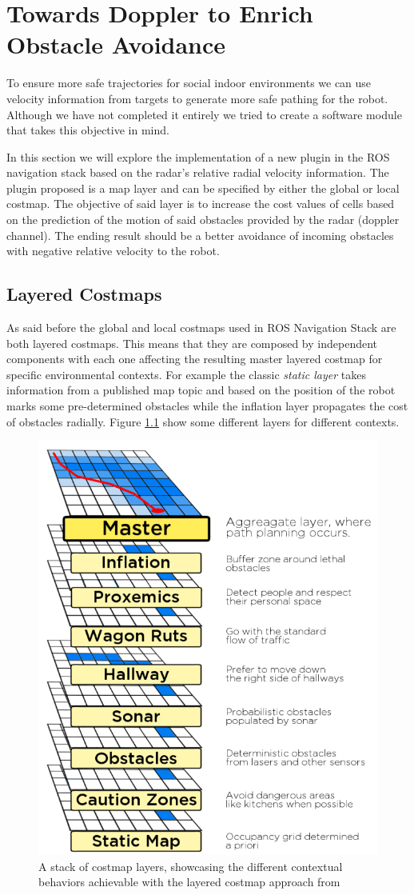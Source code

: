 \chapter{Towards Doppler to Enrich Obstacle Avoidance}
To ensure more safe trajectories for social indoor environments we can use velocity information from targets to generate more safe pathing for  the robot. Although we have not completed it entirely  we tried to create a software module that takes this objective in mind.

In this section we will explore the implementation of a new plugin in the ROS navigation stack based on the radar's relative radial velocity information. The plugin proposed is a map layer and can be specified by either the global or local costmap. The objective of said layer is to increase the cost values of cells based on the prediction of the motion of said obstacles provided by the radar (doppler channel). The ending result should be a better avoidance of incoming obstacles with negative relative velocity  to the robot.

\section{Layered Costmaps}
As said before the global and local costmaps used in \ac{ROS} Navigation Stack are both layered costmaps.
This means that they are composed by independent components with each one affecting the resulting master layered costmap for specific environmental contexts. For example the classic \textit{static layer} takes information from a published map topic and based on the position of the robot marks some  pre-determined obstacles while the inflation layer propagates the cost of obstacles radially.  Figure \ref{fig::layers} show some different layers for different contexts.
\begin{figure}[ht!] 
\centerline{\includegraphics [width=0.5 \textwidth]{imgs/chapter6/layers.png}}
\caption[A stack of costmap layers]{A stack of costmap layers, showcasing the different contextual
behaviors achievable with the layered costmap approach from \cite{lu2014layered}}
\label{fig::layers}
\end{figure}

